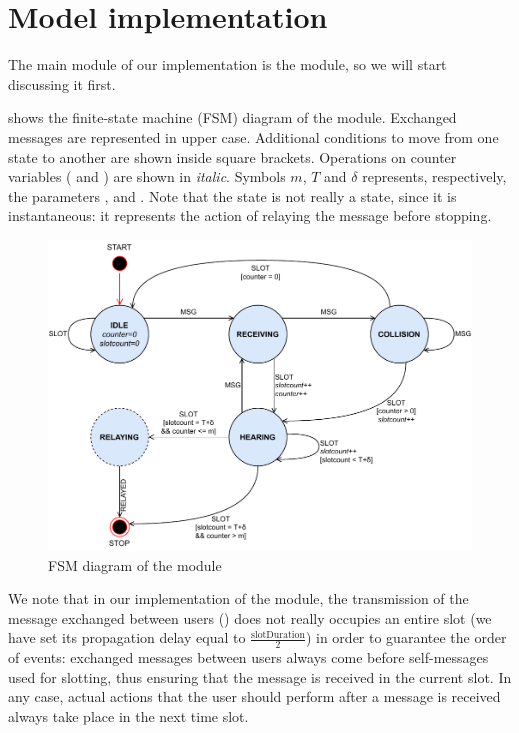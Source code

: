 \section{Model implementation}\label{sec:implementation}

The main module of our implementation is the  module, so we will
start discussing it first.

 shows the finite-state machine (FSM) diagram of the
 module. Exchanged messages are represented in upper case. Additional
conditions to move from one state to another are shown inside square brackets.
Operations on counter variables ( and ) are shown
in \textit{italic}. Symbols \(m\), \(T\) and \(\delta\) represents,
respectively, the parameters ,  and
. Note that the  state is not really a state,
since it is instantaneous: it represents the action of relaying the message
before stopping.

\begin{figure}[htb]
	\centering
	\includegraphics[width=\textwidth]{img/userfsm}
	\caption{FSM diagram of the  module}\label{fig:userfsm}
\end{figure}

We note that in our implementation of the  module, the transmission
of the message exchanged between users () does not really occupies an
entire slot (we have set its propagation delay equal to
\(\frac{\textrm{slotDuration}}{2}\)) in order to guarantee the order of events:
exchanged messages between users always come before self-messages used for
slotting, thus ensuring that the message is received in the current slot. In any
case, actual actions that the user should perform after a message is received
always take place in the next time slot.

